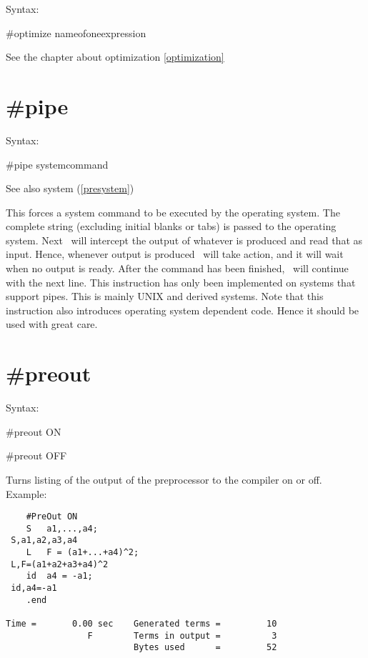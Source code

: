 \noindent Syntax:

\#optimize nameofoneexpression

See the chapter about optimization \ref{optimization}
 
 
\section{\#pipe}
\label{prepipe}

\noindent Syntax:

\#pipe systemcommand
 
\noindent See also system (\ref{presystem})

\noindent This forces a system command to be executed by the 
operating system. The complete string (excluding initial blanks or tabs) is 
passed to the operating system. Next \FORM\ will intercept the output of 
whatever is produced and read that as input. Hence, whenever output is 
produced \FORM\ will take action, and it will wait when no output is ready. 
After the command has been finished, \FORM\ will continue with the next line. 
This instruction has only been implemented on systems that support 
pipes. This is mainly UNIX and derived systems. 
Note that this instruction also introduces operating system dependent code. 
Hence it should be used with great care.

 
\section{\#preout}
\label{prepreout}

\noindent Syntax:

\#preout ON

\#preout OFF

\noindent Turns listing of the output of the preprocessor 
to the compiler on or off. Example:
\begin{verbatim}
    #PreOut ON
    S   a1,...,a4;
 S,a1,a2,a3,a4
    L   F = (a1+...+a4)^2;
 L,F=(a1+a2+a3+a4)^2
    id  a4 = -a1;
 id,a4=-a1
    .end

Time =       0.00 sec    Generated terms =         10
                F        Terms in output =          3
                         Bytes used      =         52
\end{verbatim}

